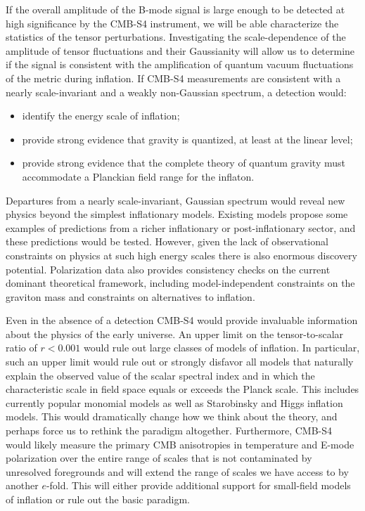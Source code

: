 If the overall amplitude of the B-mode signal is large enough to be detected at high significance by the CMB-S4 instrument, we will be able characterize the statistics of the tensor perturbations. Investigating the scale-dependence of the amplitude of tensor fluctuations and their Gaussianity will allow us to determine if the signal is consistent with the amplification of quantum vacuum fluctuations of the metric during inflation. If CMB-S4 measurements are consistent with a nearly scale-invariant and a weakly non-Gaussian spectrum, a detection would:
\begin{itemize}
 \item identify the energy scale of inflation;
 \item provide strong evidence that gravity is quantized, at least at the linear level;
 \item provide strong evidence that the complete theory of quantum gravity must accommodate a Planckian field range for the inflaton.
\end{itemize}

Departures from a nearly scale-invariant, Gaussian spectrum would reveal new physics beyond the simplest inflationary models. Existing models propose some examples of predictions from a richer inflationary or post-inflationary sector, and these predictions would be tested. However, given the lack of observational constraints on physics at such high energy scales there is also enormous discovery potential. Polarization data also provides consistency checks on the current dominant theoretical framework, including model-independent constraints on the graviton mass and constraints on alternatives to inflation.

Even in the absence of a detection CMB-S4 would provide invaluable information about the physics of the early universe. An upper limit on the tensor-to-scalar ratio of $r<0.001$ would rule out large classes of models of inflation. In particular, such an upper limit would rule out or strongly disfavor all models that naturally explain the observed value of the scalar spectral index and in which the characteristic scale in field space equals or exceeds the Planck scale. This includes currently popular monomial models as well as Starobinsky and Higgs inflation models. This would dramatically change how we think about the theory, and perhaps force us to rethink the paradigm altogether. Furthermore, CMB-S4 would likely measure the primary CMB anisotropies in temperature and E-mode polarization over the entire range of scales that is not contaminated by unresolved foregrounds and will extend the range of scales we have access to by another $e$-fold. This will either provide additional support for small-field models of inflation or rule out the basic paradigm.


